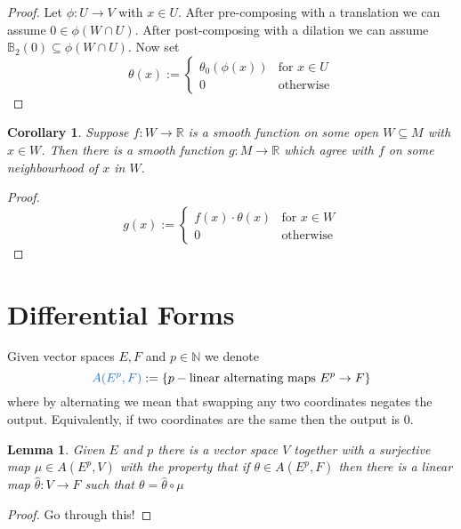 \documentclass[11pt]{article}
\newcommand{\defeq}{:=}
\newcommand{\R}{\mathbb{R}}
\newcommand{\N}{\mathbb{N}}
\newenvironment{defin}
	{\begin{mdframed}[backgroundcolor=white, roundcorner=5pt, linewidth=1pt, linecolor=RoyalBlue]
		\setlength{\parindent}{0pt}}
	{\end{mdframed}}
\newcommand{\mdf}[1]{{\color{RoyalBlue} #1}}
\newtheorem{cor}[theorem]{Corollary}
\newtheorem{lemma}[theorem]{Lemma}
\begin{document}
\begin{proof}
Let $\phi:U \to V$ with $x\in U$.
After pre-composing with a translation we can assume $0\in\phi (W\cap U)$.
After post-composing with a dilation we can assume $\mathbb{B}_2(0)\subseteq \phi(W\cap U)$.
Now set 
\[
\theta(x) \defeq 
\begin{cases}
	\theta_0(\phi(x)) & \text{for }x\in U \\
	0 				  & \text{otherwise}
\end{cases}
\]
\end{proof}

\begin{cor}
Suppose $f:W \to \R$ is a smooth function on some open $W\subseteq M$ with $x\in W$.
Then there is a smooth function $g:M \to \R$ which agree with $f$ on some neighbourhood of $x$ in $W$.
\end{cor}
\begin{proof}
\[
	g(x)\defeq 
\begin{cases}
	f(x)\cdot\theta(x) & \text{for }x\in W \\
	0 & \text{otherwise}
\end{cases}
\]
\end{proof}



\section{Differential Forms}
\begin{defin}
Given vector spaces $E, F$ and $p\in \N$ we denote
\[
	\mdf{A(E^p, F)}\defeq \left\{p-\text{linear alternating maps }E^p\to F\right\}
\]
where by alternating we mean that swapping any two coordinates negates the output.
Equivalently, if two coordinates are the same then the output is $0$.
\end{defin}

\begin{lemma}
Given $E$ and $p$ there is a vector space $V$ together with a surjective map $\mu\in A(E^p, V)$ with the property that if $\theta\in A(E^p, F)$ then there is a linear map $\hat{\theta}:V\to F$ such that $\theta = \hat{\theta}\circ\mu$
\end{lemma}

\begin{proof}
Go through this!
\end{proof}

\begin{figure}[H]
	\centering
\end{figure}
\end{document}
